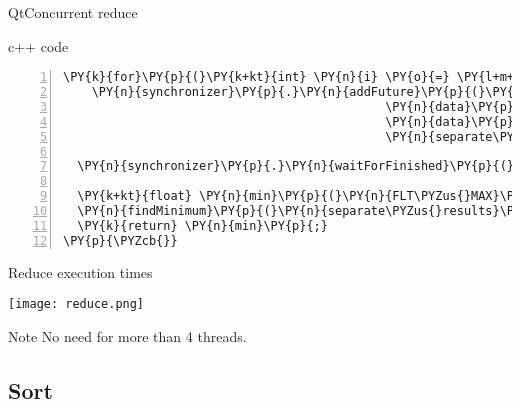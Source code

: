 \documentclass{beamer}
\begin{document}
\begin{frame}[fragile]{QtConcurrent reduce}
\begin{block}{c++ code}
\begin{Verbatim}[commandchars=\\\{\},numbers=left,firstnumber=1,stepnumber=1]
  \PY{k}{for}\PY{p}{(}\PY{k+kt}{int} \PY{n}{i} \PY{o}{=} \PY{l+m+mi}{0}\PY{p}{;} \PY{n}{i} \PY{o}{<} \PY{n}{numberOfThreads}\PY{p}{;} \PY{n}{i}\PY{o}{+}\PY{o}{+}\PY{p}{)}
    \PY{n}{synchronizer}\PY{p}{.}\PY{n}{addFuture}\PY{p}{(}\PY{n}{QtConcurrent}\PY{o}{:}\PY{o}{:}\PY{n}{run}\PY{p}{(}\PY{n}{findLocalMinimum}\PY{p}{,}
                                             \PY{n}{data}\PY{p}{.}\PY{n}{begin}\PY{p}{(}\PY{p}{)}\PY{o}{+}\PY{n}{i}\PY{o}{*}\PY{n}{chunkSize}\PY{p}{,}
                                             \PY{n}{data}\PY{p}{.}\PY{n}{begin}\PY{p}{(}\PY{p}{)}\PY{o}{+}\PY{p}{(}\PY{n}{i}\PY{o}{+}\PY{l+m+mi}{1}\PY{p}{)}\PY{o}{*}\PY{n}{chunkSize}\PY{p}{,}
                                             \PY{n}{separate\PYZus{}results}\PY{p}{.}\PY{n}{data}\PY{p}{(}\PY{p}{)}\PY{o}{+}\PY{n}{i}\PY{p}{)}\PY{p}{)}\PY{p}{;}

  \PY{n}{synchronizer}\PY{p}{.}\PY{n}{waitForFinished}\PY{p}{(}\PY{p}{)}\PY{p}{;}

  \PY{k+kt}{float} \PY{n}{min}\PY{p}{(}\PY{n}{FLT\PYZus{}MAX}\PY{p}{)}\PY{p}{;}
  \PY{n}{findMinimum}\PY{p}{(}\PY{n}{separate\PYZus{}results}\PY{p}{.}\PY{n}{begin}\PY{p}{(}\PY{p}{)}\PY{p}{,} \PY{n}{separate\PYZus{}results}\PY{p}{.}\PY{n}{end}\PY{p}{(}\PY{p}{)}\PY{p}{,} \PY{n}{min}\PY{p}{)}\PY{p}{;}
  \PY{k}{return} \PY{n}{min}\PY{p}{;}
\PY{p}{\PYZcb{}}
\end{Verbatim}

\end{block}

\end{frame}


\begin{frame}[fragile]{Reduce execution times}

\begin{center}
\texttt{[image: reduce.png]} 
\end{center}

\begin{exampleblock}{Note}
\small
No need for more than 4 threads.
\end{exampleblock}

\end{frame}

\subsection{Sort}

\end{document}
